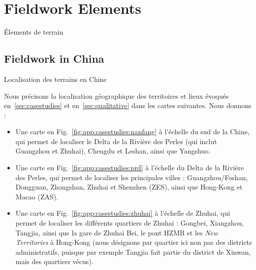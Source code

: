 



\newpage

\section{Fieldwork Elements}{Élements de terrain}

\label{app:sec:qualitative}



\subsection{Fieldwork in China}{Localisation des terrains en Chine}


Nous précisons la localisation géographique des territoires et lieux évoqués en~\ref{sec:casestudies} et en~\ref{sec:qualitative} dans les cartes suivantes. Nous donnons :
\begin{itemize}
	\item Une carte en Fig.~\ref{fig:app:casestudies:nanfang} à l'échelle du sud de la Chine, qui permet de localiser le Delta de la Rivière des Perles (qui inclut Guangzhou et Zhuhai), Chengdu et Leshan, ainsi que Yangshuo.
	\item Une carte en Fig.~\ref{fig:app:casestudies:prd} à l'échelle du Delta de la Rivière des Perles, qui permet de localiser les principales villes : Guangzhou/Foshan, Dongguan, Zhongshan, Zhuhai et Shenzhen (ZES), ainsi que Hong-Kong et Macao (ZAS).
	\item Une carte en Fig.~\ref{fig:app:casestudies:zhuhai} à l'échelle de Zhuhai, qui permet de localiser les différents quartiers de Zhuhai : Gongbei, Xiangzhou, Tangjia, ainsi que la gare de Zhuhai Bei, le pont HZMB et les \emph{New Territories} à Hong-Kong (nous désignons par quartier ici non pas des districts administratifs, puisque par exemple Tangjia fait partie du district de Xinwan, mais des quartiers vécus).
\end{itemize}



